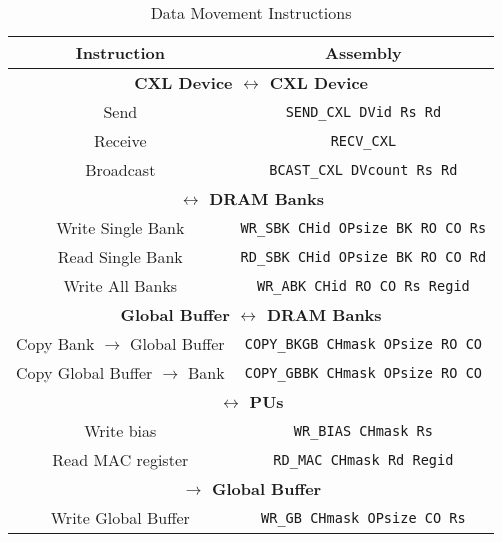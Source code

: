 \begin{table}[h]
    \footnotesize
    \centering
    \caption{\att{} Data Movement Instructions}
    \label{tab:ISA_MOVE}    
    \begin{tabular}{|c||c|}
        \hline
        \textbf{Instruction} & \textbf{Assembly} \\
        \hline
        \hline
        \multicolumn{2}{|c|}{\textbf{CXL Device $\leftrightarrow$ CXL Device}} \\
        \hline
        Send & \texttt{SEND\_CXL DVid Rs Rd} \\
        \hline
        Receive & \texttt{RECV\_CXL} \\
        \hline
        Broadcast & \texttt{BCAST\_CXL DVcount Rs Rd} \\
        \hline
        \multicolumn{2}{|c|}{\textbf{\rf{} $\leftrightarrow$ DRAM Banks}} \\
        \hline
        Write Single Bank & \texttt{WR\_SBK CHid OPsize BK RO CO Rs} \\
        \hline
        Read Single Bank & \texttt{RD\_SBK CHid OPsize BK RO CO Rd} \\
        \hline
        Write All Banks & \texttt{WR\_ABK CHid RO CO Rs Regid} \\
        \hline
        \multicolumn{2}{|c|}{\textbf{Global Buffer $\leftrightarrow$ DRAM Banks}} \\
        \hline
        Copy Bank $\rightarrow$ Global Buffer & \texttt{COPY\_BKGB CHmask OPsize RO CO} \\
        \hline
        Copy Global Buffer $\rightarrow$ Bank & \texttt{COPY\_GBBK CHmask OPsize RO CO} \\
        \hline
        \multicolumn{2}{|c|}{\textbf{\rf{} $\leftrightarrow$ PUs}} \\
        \hline
        Write bias & \texttt{WR\_BIAS CHmask Rs} \\
        \hline
        Read MAC register & \texttt{RD\_MAC CHmask Rd Regid} \\
        \hline
        \multicolumn{2}{|c|}{\textbf{\rf{} $\rightarrow$ Global Buffer}} \\
        \hline
        Write Global Buffer & \texttt{WR\_GB CHmask OPsize CO Rs} \\
        \hline
    \end{tabular}
\end{table}


